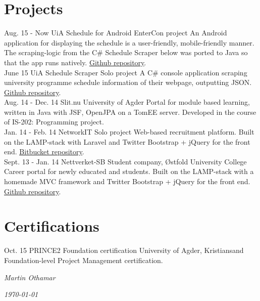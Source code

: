 \documentclass[]{cv-class}
\begin{document}
\section{Projects}
\begin{entrylist}
  \entry
    {Aug. 15 - Now}
    {UiA Schedule for Android}
    {EnterCon project}
    {An Android application for displaying the schedule is a user-friendly,
    mobile-friendly manner. The scraping-logic from the C\# Schedule Scraper below
    was ported to Java so that the app runs natively.
    \underline{\href{https://github.com/EnterCon/UiA-Timeplan-Android}
    {Github repository}}.\\}
  \entry
    {June 15}
    {UiA Schedule Scraper}
    {Solo project}
    {A C\# console application scraping university programme schedule information
    of their webpage, outputting JSON.
    \underline{\href{https://github.com/EnterCon/UiA-ScheduleScraper}
    {Github repository}}.\\}
  \entry
    {Aug. 14 - Dec. 14}
    {Slit.nu}
    {University of Agder}
    {Portal for module based learning, written in Java with JSF, OpenJPA on a TomEE server.
    Developed in the course of IS-202: Programming project.\\}
  \entry
    {Jan. 14 - Feb. 14}
    {NetworkIT}
    {Solo project}
    {Web-based recruitment platform.
    Built on the LAMP-stack with Laravel and Twitter Bootstrap + jQuery for the front end.
    \underline{\href{https://bitbucket.org/martinothamar/networkit}{Bitbucket repository}}.\\}
  \entry
    {Sept. 13 - Jan. 14}
    {Nettverket-SB}
    {Student company, {{\O}}stfold University College}
    {Career portal for newly educated and students.
    Built on the LAMP-stack with a homemade MVC framework and
    Twitter Bootstrap + jQuery for the front end.
    \underline{\href{https://github.com/martinothamar/Nettverket-SB}{Github repository}}.}
\end{entrylist}


\section{Certifications}
\begin{entrylist}
  \entry
    {Oct. 15}
    {PRINCE2 Foundation certification}
    {University of Agder, Kristiansand}
    {Foundation-level Project Management certification.}
\end{entrylist}

\vspace{1.5cm}
\begin{flushright}
\emph{Martin Othamar}
\end{flushright}
\begin{flushright}
\emph{\today}
\end{flushright}
\end{document}
